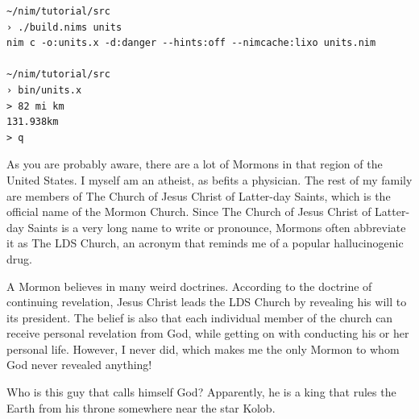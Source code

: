 \documentclass[
  12pt,
]{book}
\begin{document}
\begin{verbatim}
~/nim/tutorial/src
› ./build.nims units
nim c -o:units.x -d:danger --hints:off --nimcache:lixo units.nim

~/nim/tutorial/src
› bin/units.x
> 82 mi km
131.938km
> q
\end{verbatim}

As you are probably aware, there are a lot of Mormons in that region of
the United States. I myself am an atheist, as befits a physician. The
rest of my family are members of The Church of Jesus Christ of
Latter-day Saints, which is the official name of the Mormon Church.
Since The Church of Jesus Christ of Latter-day Saints is a very long
name to write or pronounce, Mormons often abbreviate it as The LDS
Church, an acronym that reminds me of a popular hallucinogenic drug.

A Mormon believes in many weird doctrines. According to the doctrine of
continuing revelation, Jesus Christ leads the LDS Church by revealing
his will to its president. The belief is also that each individual
member of the church can receive personal revelation from God, while
getting on with conducting his or her personal life. However, I never
did, which makes me the only Mormon to whom God never revealed anything!

Who is this guy that calls himself God? Apparently, he is a king that
rules the Earth from his throne somewhere near the star Kolob.

\pagebreak
\end{document}
